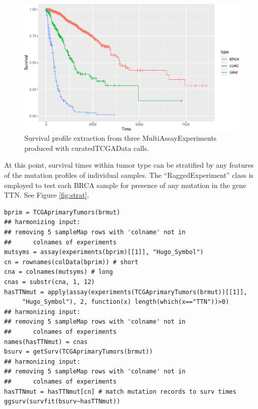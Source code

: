 \begin{figure}
\includegraphics[width=0.8\linewidth,]{bioccb_files/figure-latex/dothesurv-1} \caption{Survival profile extraction from three MultiAssayExperiments produced with curatedTCGAData calls.}\label{fig:dothesurv}
\end{figure}

At this point, survival times within tumor type can be stratified by any
features of the mutation profiles of individual samples.
The ``RaggedExperiment'' class is employed to test each BRCA sample for
presence of any mutation in the gene TTN. See Figure \ref{fig:strat}.

\begin{shaded}
\begin{verbatim}
bprim = TCGAprimaryTumors(brmut)
## harmonizing input:
## removing 5 sampleMap rows with 'colname' not in 
##      colnames of experiments
mutsyms = assay(experiments(bprim)[[1]], "Hugo_Symbol")
cn = rownames(colData(bprim)) # short
cna = colnames(mutsyms) # long
cnas = substr(cna, 1, 12)
hasTTNmut = apply(assay(experiments(TCGAprimaryTumors(brmut))[[1]], 
     "Hugo_Symbol"), 2, function(x) length(which(x=="TTN"))>0)
## harmonizing input:
## removing 5 sampleMap rows with 'colname' not in
##      colnames of experiments
names(hasTTNmut) = cnas
bsurv = getSurv(TCGAprimaryTumors(brmut))
## harmonizing input:
## removing 5 sampleMap rows with 'colname' not in 
##      colnames of experiments
hasTTNmut = hasTTNmut[cn] # match mutation records to surv times
ggsurv(survfit(bsurv~hasTTNmut))
\end{verbatim}
\end{shaded}



